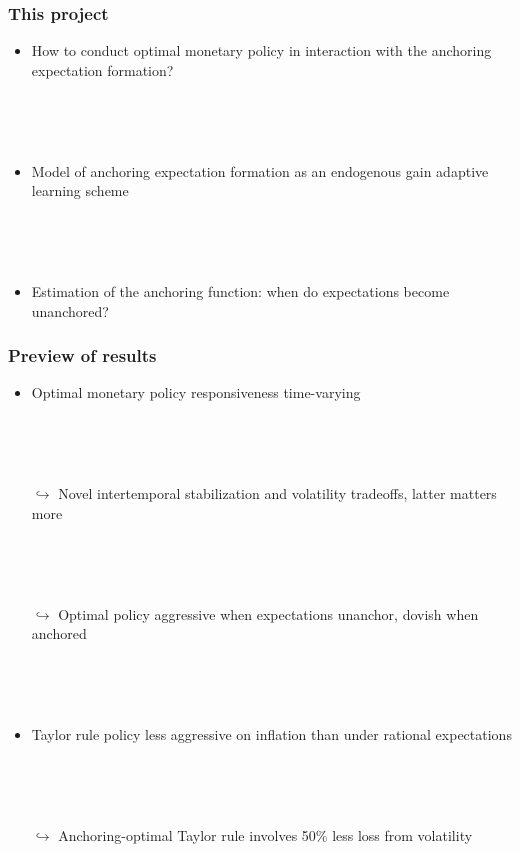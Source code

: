 \documentclass[10pt]{beamer}
\def\ppFEunanchors{1 }
\def\ppFEunanchors{1 }
\def\movei{5 }
\begin{document}
\begin{frame}
	\frametitle{This project}
	
	\begin{itemize}
	\item How to conduct optimal monetary policy in interaction with the anchoring expectation formation?
	
	\
	
	\

	\item Model of anchoring expectation formation as an endogenous gain adaptive learning scheme
	
	\
	
	\
	
	\item Estimation of the anchoring function: when do expectations become unanchored?

	\end{itemize}
	\end{frame}
\begin{frame}
	\frametitle{Preview of results}
	
	\vspace{0.5cm}
	
	\begin{itemize}
%
%	
%	
%	
	\item Optimal monetary policy responsiveness time-varying 
	
	\
	
	\
	
	
	\item[$\hookrightarrow$] Novel intertemporal stabilization and volatility tradeoffs, latter matters more 
	
	\
	
	\
	\item[$\hookrightarrow$] Optimal policy aggressive when expectations unanchor, dovish when anchored
	
	\
	
	\
	

	\item Taylor rule policy less aggressive on inflation than under rational expectations
	
	\
	
	\
	
	\item[$\hookrightarrow$] Anchoring-optimal Taylor rule involves 50\% less loss from volatility


	\end{itemize}


\end{frame}
\end{document}
